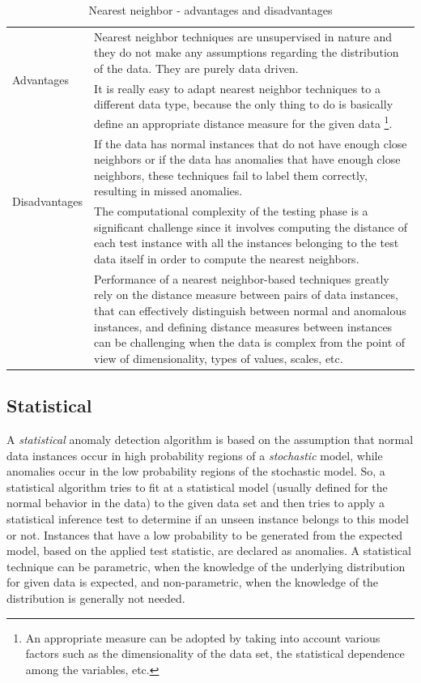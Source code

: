 \documentclass[12pt,a4paper,cucitura]{toptesi}
\begin{document}
\begin{table}
\centering
\begin{tabular}{l|p{12cm}}
\hline
\hline
\multirow{2}{*}{Advantages} & Nearest neighbor techniques are unsupervised in nature and they do not make any assumptions regarding the distribution of the data. They are purely data driven. \\
\cline{2-2}
& It is really easy to adapt nearest neighbor techniques to a different data type, because the only thing to do is basically define an appropriate distance measure for the given data \footnote{An appropriate measure can be adopted by taking into account various factors such as the dimensionality of the data set, the statistical dependence among the variables, etc.}. \\ 
\hline
\multirow{2}{*}{Disadvantages} & If the data has normal instances that do not have enough close neighbors or if the data has anomalies that have enough close neighbors, these techniques fail to label them correctly, resulting in missed anomalies. \\
\cline{2-2} 
& The computational complexity of the testing phase is a significant challenge since it involves computing the distance of each test instance with all the instances belonging to the test data itself in order to compute the nearest neighbors. \\
\cline{2-2}
& Performance of a nearest neighbor-based techniques greatly rely on the distance measure between pairs of data instances, that can effectively distinguish between normal and anomalous instances, and defining distance measures between instances can be challenging when the data is complex from the point of view of dimensionality, types of values, scales, etc. \\
\hline
\hline
\end{tabular}
\caption{Nearest neighbor - advantages and disadvantages}
\label{tab-nearest}
\end{table}

\subsection{Statistical}

A \emph{statistical} anomaly detection algorithm is based on the assumption that normal data instances occur in high probability regions of a \emph{stochastic} model, while anomalies occur in the low probability regions of the stochastic model.
So, a statistical algorithm tries to fit at a statistical model (usually defined for the normal behavior in the data) to the given data set and then tries to apply a statistical inference test to determine if an unseen instance belongs to this model or not.
Instances that have a low probability to be generated from the expected model, based on the applied test statistic, are declared as anomalies. 
A statistical technique can be parametric, when the knowledge of the underlying distribution for given data is expected, and non-parametric, when the knowledge of the distribution is generally not needed.
\end{document}
